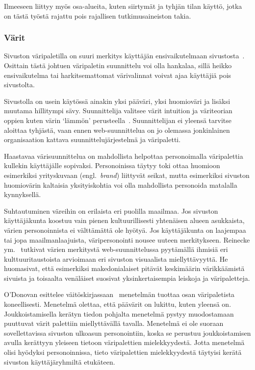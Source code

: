 \documentclass[finnish, 12pt, a4paper, elec, utf8, a-1b, online]{aaltothesis}
\begin{document}
Ilmeeseen liittyy myös osa-alueita, kuten siirtymät ja tyhjän tilan käyttö,
jotka on tästä työstä rajattu pois rajallisen tutkimusaineiston takia.

\subsubsection{Värit}

Sivuston väripaletilla on suuri merkitys käyttäjän ensivaikutelmaan
sivustosta~\cite{10.1145/2470654.2481281}. Osittain tästä johtuen väripaletin
suunnittelu voi olla hankalaa, sillä heikko ensivaikutelma tai harkitsemattomat
värivalinnat voivat ajaa käyttäjiä pois sivustolta.

Sivustolla on usein käytössä ainakin yksi pääväri, yksi huomioväri ja
lisäksi muutama hillitympi sävy. Suunnittelija valitsee värit intuition ja
väriteorian oppien kuten värin `lämmön' perusteella~\cite{odonovan_2015}.
Suunnittelijan ei yleensä tarvitse aloittaa tyhjästä, vaan ennen
web-suunnittelua on jo olemassa jonkinlainen organisaation kattava
suunnittelujärjestelmä ja väripaletti.

Haastavaa värisuunnittelua on mahdollista helpottaa personoimalla väripalettia
kullekin käyttäjälle sopivaksi. Personoinissa täytyy toki ottaa huomioon
esimerkiksi yrityskuvaan (engl.~\textit{brand}) liittyvät seikat, mutta
esimerkiksi sivuston huomiovärin kaltaisia yksityiskohtia voi olla mahdollista
personoida matalalla kynnyksellä.

Suhtautuminen väreihin on erilaista eri puolilla maailmaa. Jos sivuston
käyttäjäkunta koostuu vain pienen kultuurillisesti yhtenäisen alueen asukkaista,
värien personoinnista ei välttämättä ole hyötyä. Jos käyttäjäkunta on laajempaa
tai jopa maailmanlaajuista, väripersonointi nousee uuteen merkitykseen. Reinecke
ym.~\cite{10.1145/2556288.2557052} tutkivat värien merkitystä web-suunnittelussa
pyytämällä ihmisiä eri kulttuuritaustoista arvioimaan eri sivuston
visuaalista miellyttävyyttä. He huomasivat, että esimerkiksi makedonialaiset
pitävät keskimäärin värikkäämistä sivuista ja toisaalta venäläiset suosivat
yksinkertaisempia leiskoja ja väripaletteja.

O'Donovan esittelee väitöskirjassaan~\cite{odonovan_2015} menetelmän tuottaa
osan väripaletista koneellisesti. Menetelmä olettaa, että päävärit on lukittu,
kuten yleensä on. Joukkoistamisella kerätyn tiedon pohjalta menetelmä pystyy
muodostamaan puuttuvat värit palettiin miellyttävällä tavalla. Menetelmä ei ole
suoraan sovellettavissa sivuston ulkoasun personointiin, koska se perustuu
joukkoistamisen avulla kerättyyn yleiseen tietoon väripalettien mielekkyydestä.
Jotta menetelmä olisi hyödyksi personoinnissa, tieto väripalettien
mielekkyydestä täytyisi kerätä sivuston käyttäjäryhmiltä etukäteen.
\end{document}
